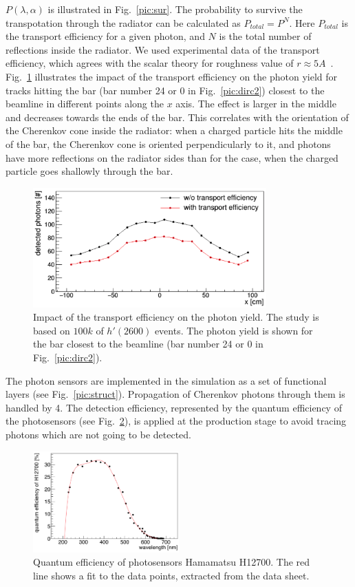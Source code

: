 $P(\lambda,\alpha)$ is illustrated in Fig.~\ref{pic:sur}. The probability to survive the transpotation through the radiator can be calculated as $P_{total} = P^{N}$. Here $P_{total}$ is the transport efficiency for a given photon, and $N$ is the total number of reflections inside the radiator. We used experimental data of the transport efficiency, which agrees with the scalar theory for roughness value of $r \approx 5 A$~\cite{roughness}. Fig.~\ref{pic:tra} illustrates the impact of the transport efficiency on the photon yield for tracks hitting the bar (bar number 24 or 0 in Fig.~\ref{pic:dirc2}) closest to the beamline in different points along the $x$ axis. The effect is larger in the middle and decreases towards the ends of the bar. This correlates with the orientation of the Cherenkov cone inside the radiator: when a charged particle hits the middle of the bar, the Cherenkov cone is oriented perpendicularly to it, and photons have more reflections on the radiator sides than for the case, when the charged particle goes shallowly through the bar.

\begin{figure}[!h]
\centering
\includegraphics[width=0.8\textwidth]{pics/transport.png}
\caption{\label{pic:tra}
Impact of the transport efficiency on the photon yield. The study is based on $100k$ of $h'(2600)$ events. The photon yield is shown for the bar closest to the beamline (bar number 24 or 0 in Fig.~\ref{pic:dirc2}).
}
\end{figure}

The photon sensors are implemented in the simulation as a set of functional layers (see Fig.~\ref{pic:struct}). Propagation of Cherenkov photons through them is handled by {\geant}4. The detection efficiency, represented by the quantum efficiency of the photosensors (see Fig.~\ref{pic:qe}), is applied at the production stage to avoid tracing photons which are not going to be detected.

\begin{figure}[tb]
\centering
\includegraphics[width=0.5\textwidth]{pics/qe.png}
\caption{\label{pic:qe}
Quantum efficiency of photosensors Hamamatsu H12700. The red line shows a fit to the data points, extracted from the data sheet.
}
\end{figure}

